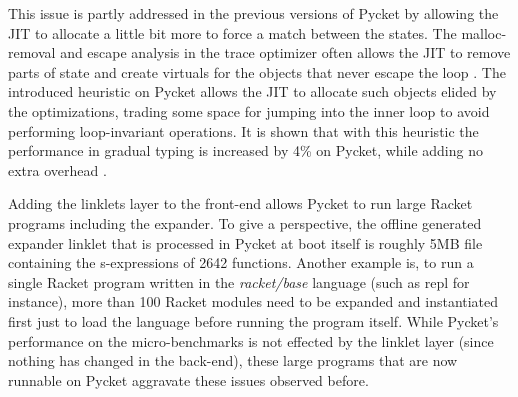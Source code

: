 This issue is partly addressed in the previous versions of Pycket by
allowing the JIT to allocate a little bit more to force a match
between the states. The malloc-removal and escape analysis in the
trace optimizer often allows the JIT to remove parts of state and
create virtuals for the objects that never escape the loop
\cite{malloc-removal:11, loop-aware:12}. The introduced heuristic on
Pycket allows the JIT to allocate such objects elided by the
optimizations, trading some space for jumping into the inner loop to
avoid performing loop-invariant operations. It is shown that with this
heuristic the performance in gradual typing is increased by 4\% on
Pycket, while adding no extra overhead \cite{pycket17}.

Adding the linklets layer to the front-end allows Pycket to run large
Racket programs including the expander. To give a perspective, the
offline generated expander linklet that is processed in Pycket at boot
itself is roughly 5MB file containing the s-expressions of 2642
functions. Another example is, to run a single Racket program written
in the \emph{racket/base} language (such as repl for instance), more
than 100 Racket modules need to be expanded and instantiated first
just to load the language before running the program itself. While
Pycket's performance on the micro-benchmarks is not effected by the
linklet layer (since nothing has changed in the back-end), these large
programs that are now runnable on Pycket aggravate these issues
observed before.


